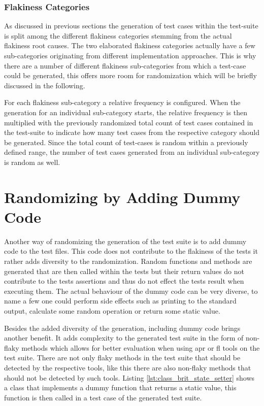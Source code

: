 \documentclass[
fancyheadings, %
%
%
]{stsreprt}
\begin{document}
\subsubsection{Flakiness Categories}
As discussed in previous sections the generation of test cases within the test-suite is split among the different flakiness categories stemming from the actual flakiness root causes. 
The two elaborated flakiness categories actually have a few sub-categories originating from different implementation approaches. 
This is why there are a number of different flakiness sub-categories from which a test-case could be generated, this offers more room for randomization which will be briefly discussed in the following. \par

For each flakiness sub-category a relative frequency is configured. 
When the generation for an individual sub-category starts, the relative frequency is then multiplied with the previously randomized total count of test cases contained in the test-suite to indicate how many test cases from the respective category should be generated. 
Since the total count of test-cases is random within a previously defined range, the number of test cases generated from an individual sub-category is random as well. 



\section{Randomizing by Adding Dummy Code}
Another way of randomizing the generation of the test suite is to add dummy code to the test files. 
This code does not contribute to the flakiness of the tests it rather adds diversity to the randomization. 
Random functions and methods are generated that are then called within the tests but their return values do not contribute to the tests assertions and thus do not effect the tests result when executing them. 
The actual behaviour of the dummy code can be very diverse, to name a few one could perform side effects such as printing to the standard output, calculate some random operation or return some static value. \par
Besides the added diversity of the generation, including dummy code brings another benefit.
It adds complexity to the generated test suite in the form of non-flaky methods which allows for better evaluation when using \acrshort{apr} or \acrshort{fl} tools on the test suite. 
There are not only flaky methods in the test suite that should be detected by the respective tools, like this there are also non-flaky methods that should not be detected by such tools.
Listing \ref{lst:class_brit_state_setter} shows a class that implements a dummy function that returns a static value, this function is then called in a test case of the generated test suite. 
\end{document}
